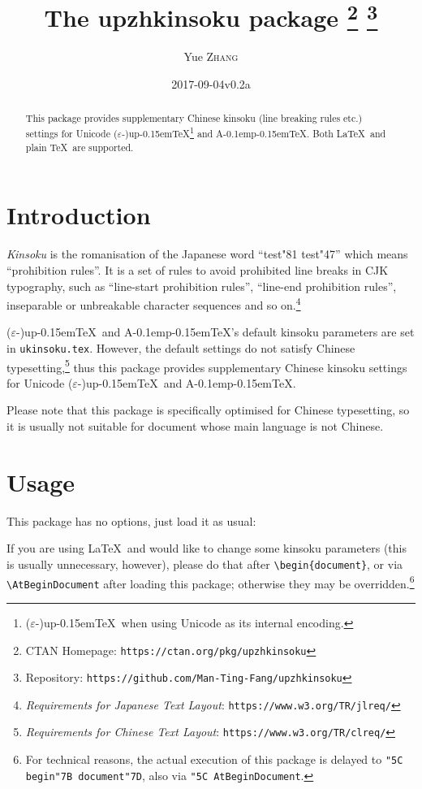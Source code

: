 \documentclass[a4paper]{article}
\newcommand\NormalSans{\normalfont\sffamily}
\newcommand\pkg[1]{{\protect\NormalSans#1}}
\newcommand\pTeX{p\kern-0.15em\TeX}
\newcommand\e{\ensuremath{\varepsilon}}
\newcommand\upTeX{u\pTeX}
\newcommand\ApTeX{A\kern-0.1em\pTeX}
\newcommand\kn{test}
\newcommand\sk{test}
\begin{document}
\title{The \pkg{upzhkinsoku} package%
  \thanks{CTAN Homepage: \texttt{https://ctan.org/pkg/upzhkinsoku}}
  \thanks{Repository: \texttt{https://github.com/Man-Ting-Fang/upzhkinsoku}}}
\author{Yue \textsc{Zhang}}
\date{2017-09-04\quad v0.2a}

\maketitle

\begin{abstract}
This package provides supplementary Chinese kinsoku (line breaking rules etc.)
settings for Unicode (\e-)\upTeX\footnote{(\e-)\upTeX\ when using Unicode as its
internal encoding.} and \ApTeX. Both \LaTeX\ and plain \TeX\ are supported.
\end{abstract}

\section{Introduction}

\textit{Kinsoku} is the romanisation of the Japanese word ``{\kn\char"81\relax
\sk\char"47}'' which means ``prohibition rules''. It is a set of rules to avoid
prohibited line breaks in CJK typography, such as ``line-start prohibition
rules'', ``line-end prohibition rules'', inseparable or unbreakable character
sequences and so on.\footnote{\textit{Requirements for Japanese Text Layout}:
\texttt{https://www.w3.org/TR/jlreq/}}

(\e-)\upTeX\ and \ApTeX's default kinsoku parameters are set in
\verb|ukinsoku.tex|. However, the default settings do not satisfy Chinese
typesetting,\footnote{\textit{Requirements for Chinese Text Layout}:
\texttt{https://www.w3.org/TR/clreq/}} thus this package provides supplementary
Chinese kinsoku settings for Unicode (\e-)\upTeX\ and \ApTeX.

Please note that this package is specifically optimised for Chinese typesetting,
so it is usually not suitable for document whose main language is not Chinese.

\section{Usage}

This package has no options, just load it as usual:
If you are using \LaTeX\ and would like to change some kinsoku parameters (this
is usually unnecessary, however), please do that after \verb|\begin{document}|,
or via \verb|\AtBeginDocument| after loading this package; otherwise they may be
overridden.\footnote{For technical reasons, the actual execution of this package
is delayed to \texttt{\char"5C begin\char"7B document\char"7D}, also via
\texttt{\char"5C AtBeginDocument}.}
\end{document}

